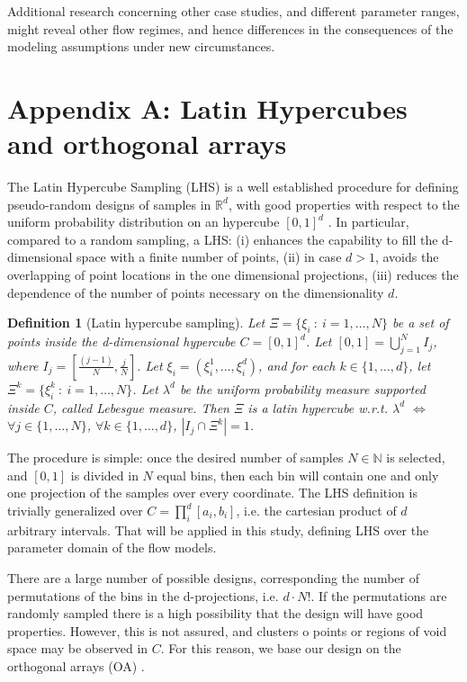 \documentclass{article}
\newtheorem{definition}[theorem]{Definition}
\begin{document}
Additional research concerning other case studies, and different parameter ranges, might reveal other flow regimes, and hence differences in the consequences of the modeling assumptions under new circumstances.


\section{Appendix A: Latin Hypercubes and orthogonal arrays}
The Latin Hypercube Sampling (LHS) is a well established procedure for defining pseudo-random designs of samples in $\mathbb R^d$, with good properties with respect to the uniform probability distribution on an hypercube $[0,1]^d$ \citep{McKay1979,Owen1992b,Stein1987,Ranjan2014,Mingyao2016}. In particular, compared to a random sampling, a LHS: (i) enhances the capability to fill the d-dimensional space with a finite number of points, (ii) in case $d>1$, avoids the overlapping of point locations in the one dimensional projections, (iii) reduces the dependence of the number of points necessary on the dimensionality $d$.

\begin{definition}[Latin hypercube sampling]
Let $\Xi=\{\xi_i\ :\ i=1,\dots,N\}$ be a set of points inside the d-dimensional hypercube $C=[0,1]^d$. Let $[0,1]=\bigcup_{j=1}^{N} I_j$, where $I_j=[\frac{(j-1)}{N},\frac{j}{N}]$. Let $\xi_i=\left(\xi_i^1,\dots,\xi_i^d\right)$, and for each $k\in\{1,\dots,d\}$, let $\Xi^k=\{\xi^k_i\ :\ i=1,\dots,N\}$. Let $\lambda^d$ be the uniform probability measure supported inside $C$, called Lebesgue measure. Then $\Xi$ is a latin hypercube w.r.t. $\lambda^d$ $\Longleftrightarrow$ $\forall j\in \{1,\dots,N\}$, $\forall k\in\{1,\dots,d\}$, $\left|I_j\cap\Xi^k\right|=1$.
\end{definition}

The procedure is simple: once the desired number of samples $N\in\mathbb N$ is selected, and $[0,1]$ is divided in $N$ equal bins, then each bin will contain one and only one projection of the samples over every coordinate. The LHS definition is trivially generalized over $C=\prod^d_i [a_i, b_i]$, i.e. the cartesian product of $d$ arbitrary intervals. That will be applied in this study, defining LHS over the parameter domain of the flow models.

There are a large number of possible designs, corresponding the number of permutations of the bins in the d-projections, i.e. $d\cdot N!$. If the permutations are randomly sampled there is a high possibility that the design will have good properties. However, this is not assured, and clusters o points or regions of void space may be observed in $C$. For this reason, we base our design on the orthogonal arrays (OA) \citep{Owen1992a,Tang1993}.
\end{document}
